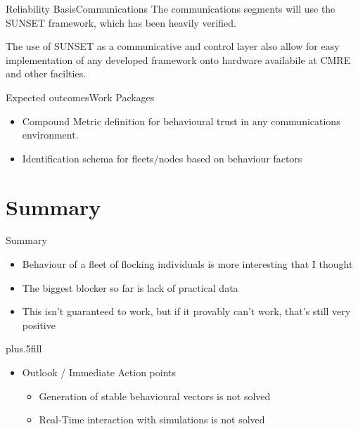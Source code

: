 \documentclass[10pt]{beamer}
\begin{document}
\begin{frame}{Reliability Basis}{Communications}
  The communications segments will use the SUNSET framework, which has been heavily verified. 

  The use of SUNSET as a communicative and control layer also allow for easy implementation of any developed framework onto hardware availabile at CMRE and other facilties.
\end{frame}

\begin{frame}{Expected outcomes}{Work Packages}
  \begin{itemize}
    \item Compound Metric definition for behavioural trust in any communications environment.
    \item Identification schema for fleets/nodes based on behaviour factors

  \end{itemize}
\end{frame}

\section*{Summary}

\begin{frame}{Summary}

  \begin{itemize}
  \item
    \alert{Behaviour} of a fleet of \alert{flocking} individuals is more interesting that I thought
  \item
    The biggest blocker so far is lack of \alert{practical data}
  \item
    This isn't guaranteed to work, but if it provably can't work, \alert{that's still very positive}
  \end{itemize}
  
  \vskip0pt plus.5fill
  \begin{itemize}
  \item
    Outlook / Immediate Action points
    \begin{itemize}
    \item
      Generation of stable behavioural vectors \alert{is not solved}
    \item
      Real-Time interaction with simulations \alert{is not solved}
    \end{itemize}
  \end{itemize}
\end{frame}
\end{document}
